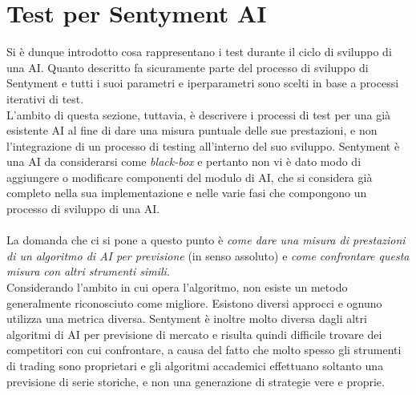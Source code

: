 \documentclass[a4paper,12pt]{report}
\begin{document}
\section{Test per Sentyment AI}
Si è dunque introdotto cosa rappresentano i test durante il ciclo di sviluppo di una AI. Quanto descritto fa sicuramente parte del processo di sviluppo di Sentyment e tutti i suoi parametri e iperparametri sono scelti in base a processi iterativi di test.\\ L'ambito di questa sezione, tuttavia, è descrivere i processi di test per una già esistente AI al fine di dare una misura puntuale delle sue prestazioni, e non l'integrazione di un processo di testing all'interno del suo sviluppo. Sentyment è una AI da considerarsi come \textit{black-box} e pertanto non vi è dato modo di aggiungere o modificare componenti del modulo di AI, che si considera già completo nella sua implementazione e nelle varie fasi che compongono un processo di sviluppo di una AI.\\~\\ La domanda che ci si pone a questo punto è \textit{come dare una misura di prestazioni di un algoritmo di AI per previsione} (in senso assoluto) e \textit{come confrontare questa misura con altri strumenti simili}.\\ Considerando l'ambito in cui opera l'algoritmo, non esiste un metodo generalmente riconosciuto come migliore. Esistono diversi approcci e ognuno utilizza una metrica diversa. Sentyment è inoltre molto diversa dagli altri algoritmi di AI per previsione di mercato e risulta quindi difficile trovare dei competitori con cui confrontare, a causa del fatto che molto spesso gli strumenti di trading sono proprietari e gli algoritmi accademici effettuano soltanto una previsione di serie storiche, e non una generazione di strategie vere e proprie.\\~\\
\end{document}
